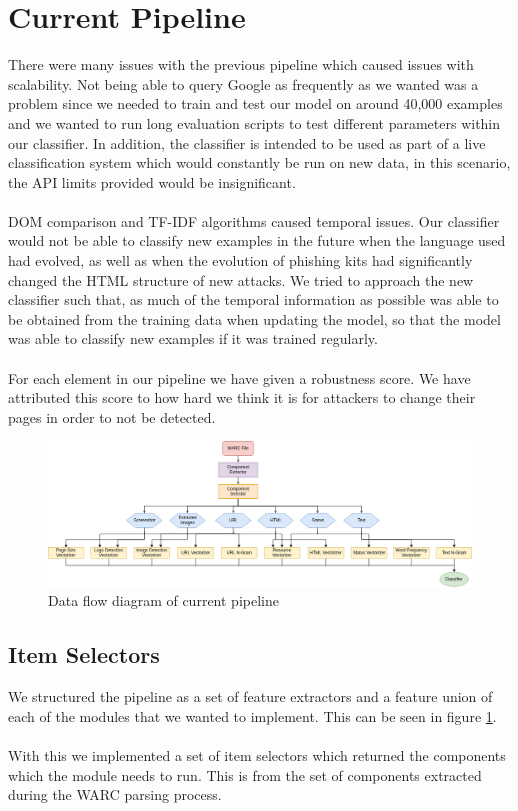 \documentclass[12pt,twoside]{report}
\begin{document}
\section{Current Pipeline}
There were many issues with the previous pipeline which caused issues with scalability. Not being able to query Google as frequently as we wanted was a problem since we needed to train and test our model on around 40,000 examples and we wanted to run long evaluation scripts to test different parameters within our classifier. In addition, the classifier is intended to be used as part of a live classification system which would constantly be run on new data, in this scenario, the API limits provided would be insignificant.
\\\\
DOM comparison and TF-IDF algorithms caused temporal issues. Our classifier would not be able to classify new examples in the future when the language used had evolved, as well as when the evolution of phishing kits had significantly changed the HTML structure of new attacks. We tried to approach the new classifier such that, as much of the temporal information as possible was able to be obtained from the training data when updating the model, so that the model was able to classify new examples if it was trained regularly.
\\\\
For each element in our pipeline we have given a robustness score. We have attributed this score to how hard we think it is for attackers to change their pages in order to not be detected.
\begin{figure}[h]
  \begin{center}
    \includegraphics[width=155mm]{images/pipeline.png}
  \end{center}
  \caption{Data flow diagram of current pipeline}
  \label{fig:currentpipeline}
\end{figure}
\subsection{Item Selectors}
We structured the pipeline as a set of feature extractors and a feature union of each of the modules that we wanted to implement. This can be seen in figure \ref{fig:currentpipeline}.
\\\\
With this we implemented a set of item selectors which returned the components which the module needs to run. This is from the set of components extracted during the WARC parsing process.
\end{document}
